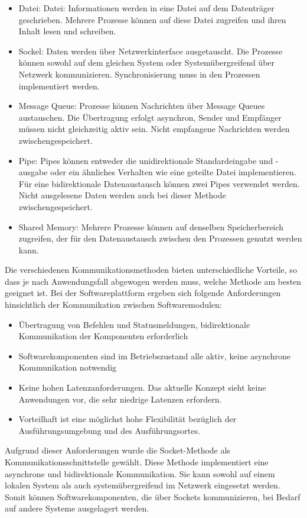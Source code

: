 \begin{itemize}
    \item Datei: Datei: Informationen werden in eine Datei auf dem Datenträger geschrieben. Mehrere Prozesse können auf diese Datei zugreifen und ihren Inhalt lesen und schreiben.
    \item Sockel: Daten werden über Netzwerkinterface ausgetauscht. Die Prozesse können sowohl auf dem gleichen System oder Systemübergreifend über Netzwerk kommunizieren. Synchronisierung muss in den Prozessen implementiert werden.
    \item Message Queue: Prozesse können Nachrichten über Message Queues austauschen. Die Übertragung erfolgt asynchron, Sender und Empfänger müssen nicht gleichzeitig aktiv sein. Nicht empfangene Nachrichten werden zwischengespeichert. 
    \item Pipe: Pipes können entweder die unidirektionale Standardeingabe und -ausgabe oder ein ähnliches Verhalten wie eine geteilte Datei implementieren. Für eine bidirektionale Datenaustausch können zwei Pipes verwendet werden. Nicht ausgelesene Daten werden auch bei dieser Methode zwischengespeichert. 
    \item Shared Memory: Mehrere Prozesse können auf denselben Speicherbereich zugreifen, der für den Datenaustausch zwischen den Prozessen genutzt werden kann.
\end{itemize}

Die verschiedenen Kommunikationsmethoden bieten unterschiedliche Vorteile, so dass je nach Anwendungsfall abgewogen werden muss, welche Methode am besten geeignet ist. Bei der Softwareplattform ergeben sich folgende Anforderungen hinsichtlich der Kommunikation zwischen Softwaremodulen:

\begin{itemize}
    \item Übertragung von Befehlen und Statusmeldungen, bidirektionale Kommunikation der Komponenten erforderlich
    \item Softwarekomponenten sind im Betriebszustand alle aktiv, keine asynchrone Kommunikation notwendig
    \item Keine hohen Latenzanforderungen. Das aktuelle Konzept sieht keine Anwendungen vor, die sehr niedrige Latenzen erfordern.
    \item Vorteilhaft ist eine möglichst hohe Flexibilität bezüglich der Ausführungsumgebung und des Ausführungsortes.
\end{itemize}

Aufgrund dieser Anforderungen wurde die Socket-Methode als Kommunikationsschnittstelle gewählt. Diese Methode implementiert eine asynchrone und bidirektionale Kommunikation. Sie kann sowohl auf einem lokalen System als auch systemübergreifend im Netzwerk eingesetzt werden. Somit können Softwarekomponenten, die über Sockets kommunizieren, bei Bedarf auf andere Systeme ausgelagert werden. 

